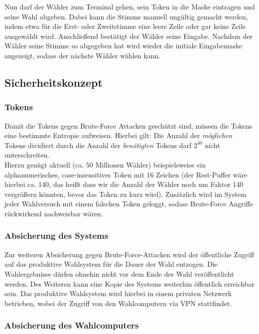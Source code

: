 \documentclass[a4paper]{scrreprt}
\begin{document}
Nun darf der Wähler zum Terminal gehen, sein Token in die Maske eintragen und seine Wahl abgeben. Dabei kann die Stimme manuell ungültig gemacht werden, indem etwa für die Erst- oder Zweitstimme eine leere Zeile oder gar keine Zeile ausgewählt wird.
Anschließend bestätigt der Wähler seine Eingabe. Nachdem der Wähler seine Stimme so abgegeben hat wird wieder die initiale Eingabemaske angezeigt, sodass der nächste Wähler wählen kann.

\subsection{Sicherheitskonzept}

\subsubsection{Tokens}

Damit die Tokens gegen Brute-Force Attacken geschützt sind, müssen die Tokens eine bestimmte Entropie aufweisen.
Hierbei gilt: Die Anzahl der \textit{möglichen} Tokens dividiert durch die Anzahl der \textit{benötigten} Tokens darf $2^{40}$ nicht unterschreiten. \\

Hierzu genügt aktuell (ca. 50 Millionen Wähler) beispielsweise ein alphanumerisches, case-insensitives Token mit 16 Zeichen (der Rest-Puffer wäre hierbei ca. 140, das heißt dass wir die Anzahl der Wähler noch um Faktor 140 vergrößern könnten, bevor das Token zu kurz wird).
Zusätzlich wird im System jeder Wahlversuch mit einem falschen Token geloggt, sodass Brute-Force Angriffe rückwirkend nachweisbar wären.

\subsubsection{Absicherung des Systems}

Zur weiteren Absicherung gegen Brute-Force-Attacken wird der öffentliche Zugriff auf das produktive Wahlsystem für die Dauer der Wahl entzogen. Die Wahlergebnisse dürfen ohnehin nicht vor dem Ende der Wahl veröffentlicht werden. Des Weiteren kann eine Kopie des Systems weiterhin öffentlich erreichbar sein. Das produktive Wahlsystem wird hierbei in einem privaten Netzwerk betrieben, wobei der Zugriff von den Wahlcomputern via VPN stattfindet.

\subsubsection{Absicherung des Wahlcomputers}
\end{document}
